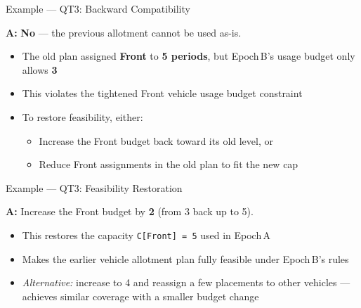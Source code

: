 \documentclass[aspectratio=169,10pt]{beamer}
\begin{document}
\begin{frame}[t]{Example — QT3: Backward Compatibility}
\vspace{2pt}
\vspace{6pt}
\small\textbf{\textcolor{lgrn}{A:}}\;
\textbf{No} --- the previous allotment cannot be used as-is.
\vspace{2pt}
\begin{itemize}\setlength\itemsep{5pt}
  \item The old plan assigned \textbf{Front} to \textbf{5 periods},
        but Epoch\,B's usage budget only allows \textbf{3}
  \item This violates the tightened Front vehicle usage budget constraint
  \item To restore feasibility, either:
        \begin{itemize}\setlength\itemsep{2pt}
          \item Increase the Front budget back toward its old level, or
          \item Reduce Front assignments in the old plan to fit the new cap
        \end{itemize}
\end{itemize}
\end{frame}

\begin{frame}[t]{Example — QT3: Feasibility Restoration}
\vspace{2pt}
\vspace{6pt}
\small\textbf{\textcolor{lgrn}{A:}}\;
Increase the Front budget by \textbf{2} (from 3 back up to 5).
\vspace{2pt}
\begin{itemize}\setlength\itemsep{5pt}
  \item This restores the capacity \texttt{C[Front]\,=\,5} used in Epoch\,A
  \item Makes the earlier vehicle allotment plan fully feasible under Epoch\,B's rules
  \item \textcolor{mgray}{\textit{Alternative:}} increase to 4 and reassign a few
        placements to other vehicles --- achieves similar coverage with a smaller
        budget change
\end{itemize}
\end{frame}
\end{document}
